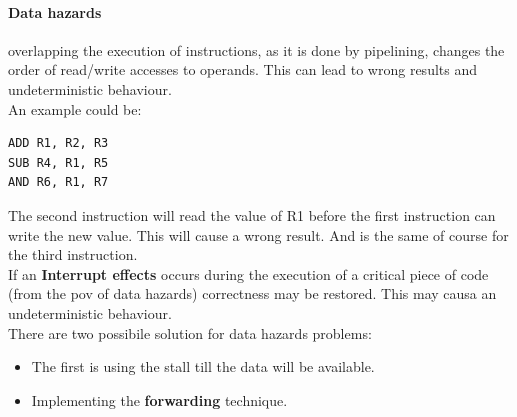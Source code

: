 \documentclass[12pt]{article}
\begin{document}
\paragraph{Data hazards} overlapping the execution of instructions, as it is done by pipelining, changes the order of read/write accesses to operands. This can lead to wrong results and undeterministic behaviour.\\
An example could be:\\
\begin{lstlisting}
ADD R1, R2, R3
SUB R4, R1, R5
AND R6, R1, R7
\end{lstlisting}
The second instruction will read the value of R1 before the first instruction can write the new value. This will cause a wrong result. And is the same of course for the third instruction.\\
If an \textbf{Interrupt effects} occurs during the execution of a critical piece of code (from the pov of data hazards) correctness may be restored. This may causa an undeterministic behaviour.\\
There are two possibile solution for data hazards problems:
\begin{itemize}
  \item The first is using the stall till the data will be available.
  \item Implementing the \textbf{forwarding} technique.
\end{itemize}




























\end{document}
